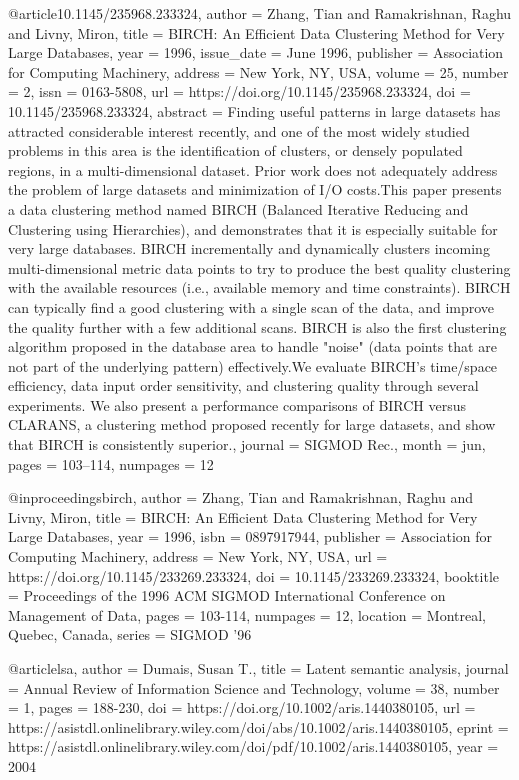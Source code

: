 @article{10.1145/235968.233324,
author = {Zhang, Tian and Ramakrishnan, Raghu and Livny, Miron},
title = {BIRCH: An Efficient Data Clustering Method for Very Large Databases},
year = {1996},
issue_date = {June 1996},
publisher = {Association for Computing Machinery},
address = {New York, NY, USA},
volume = {25},
number = {2},
issn = {0163-5808},
url = {https://doi.org/10.1145/235968.233324},
doi = {10.1145/235968.233324},
abstract = {Finding useful patterns in large datasets has attracted considerable interest recently, and one of the most widely studied problems in this area is the identification of clusters, or densely populated regions, in a multi-dimensional dataset. Prior work does not adequately address the problem of large datasets and minimization of I/O costs.This paper presents a data clustering method named BIRCH (Balanced Iterative Reducing and Clustering using Hierarchies), and demonstrates that it is especially suitable for very large databases. BIRCH incrementally and dynamically clusters incoming multi-dimensional metric data points to try to produce the best quality clustering with the available resources (i.e., available memory and time constraints). BIRCH can typically find a good clustering with a single scan of the data, and improve the quality further with a few additional scans. BIRCH is also the first clustering algorithm proposed in the database area to handle "noise" (data points that are not part of the underlying pattern) effectively.We evaluate BIRCH's time/space efficiency, data input order sensitivity, and clustering quality through several experiments. We also present a performance comparisons of BIRCH versus CLARANS, a clustering method proposed recently for large datasets, and show that BIRCH is consistently superior.},
journal = {SIGMOD Rec.},
month = jun,
pages = {103–114},
numpages = {12}
}

@inproceedings{birch,
author = {Zhang, Tian and Ramakrishnan, Raghu and Livny, Miron},
title = {BIRCH: An Efficient Data Clustering Method for Very Large Databases},
year = {1996},
isbn = {0897917944},
publisher = {Association for Computing Machinery},
address = {New York, NY, USA},
url = {https://doi.org/10.1145/233269.233324},
doi = {10.1145/233269.233324},
booktitle = {Proceedings of the 1996 ACM SIGMOD International Conference on Management of Data},
pages = {103-114},
numpages = {12},
location = {Montreal, Quebec, Canada},
series = {SIGMOD '96}
}

@article{lsa,
author = {Dumais, Susan T.},
title = {Latent semantic analysis},
journal = {Annual Review of Information Science and Technology},
volume = {38},
number = {1},
pages = {188-230},
doi = {https://doi.org/10.1002/aris.1440380105},
url = {https://asistdl.onlinelibrary.wiley.com/doi/abs/10.1002/aris.1440380105},
eprint = {https://asistdl.onlinelibrary.wiley.com/doi/pdf/10.1002/aris.1440380105},
year = {2004}
}

